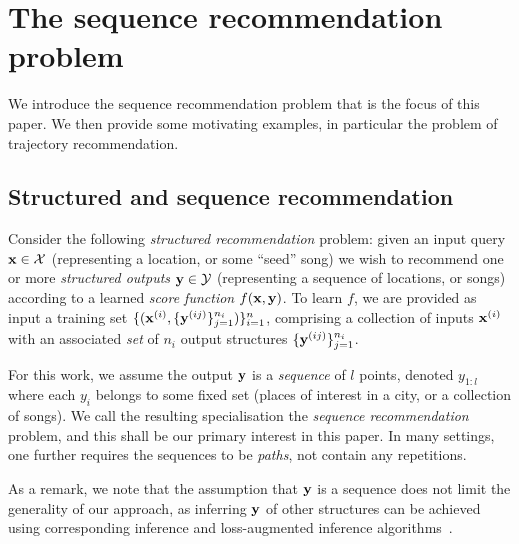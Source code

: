 
\secmoveup
\section{The sequence recommendation problem}
\label{sec:recseq}
\textmoveup

We introduce the sequence recommendation problem that is the focus of this paper.
We then provide some motivating examples, in particular the problem of trajectory recommendation.

\secmoveup
\subsection{Structured and sequence recommendation}
\label{sec:seqrec-defn}

Consider the following  %
\emph{structured recommendation} problem:
given an input query $\mathbf{x} \in \mathcal{X}$ (representing \eg a location, or some ``seed'' song)
we wish to recommend one or more \emph{structured outputs} $\mathbf{y} \in \mathcal{Y}$ (representing \eg a sequence of locations, or songs)
according to a learned \emph{score function} $f(\mathbf{x},\mathbf{y})$.
To learn $f$,
we are provided as input a training set
$\{ ( \mathbf{x}^{({i})}, \{ \mathbf{y}^{({ij})} \}_{j=1}^{n_i} ) \}_{i=1}^{n}$,
comprising a collection of inputs $\mathbf{x}^{({i})}$ with an associated \emph{set} of $n_i$ output structures $\{ \mathbf{y}^{({ij})} \}_{j=1}^{n_i}$.

For this work, we assume the output $\mathbf{y}$ is a \emph{sequence} of $l$ points, denoted $y_{1:l}$
where each $y_i$ belongs to some fixed set (\eg places of interest in a city, or a collection of songs).
We call the resulting specialisation the \emph{sequence recommendation} problem,
and this shall be our primary interest in this paper.
In many settings, one further requires the sequences to be \emph{paths}, \ie not contain any repetitions.

As a remark, we note that the assumption that $\mathbf{y}$ is a sequence does not limit the generality of our approach,
as inferring $\mathbf{y}$ of other structures can be achieved using corresponding inference and loss-augmented inference algorithms~\cite{joachims2009predicting}.  %


